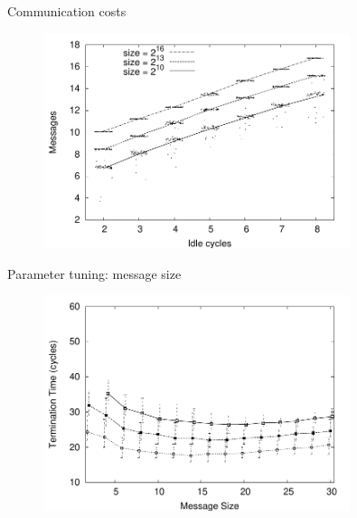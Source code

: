 \begin{frame}{Communication costs}
	
\begin{figure}
	\includegraphics[width=0.80\textwidth]{sort-inactive-msg}
\end{figure}	
	
\end{frame}

\begin{frame}{Parameter tuning: message size}
	
\begin{figure}
	\includegraphics[width=0.80\textwidth]{sort-msgsize-time}
\end{figure}	
	
\end{frame}

